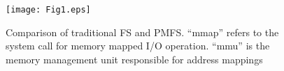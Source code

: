 
\begin{figure}
\centering
\texttt{[image: Fig1.eps]}
\caption{Comparison of traditional FS and PMFS. ``mmap'' refers to the system call for memory mapped I/O operation. 
``mmu'' is the memory management unit responsible for address mappings}
\label{Fig1}
\end{figure}



